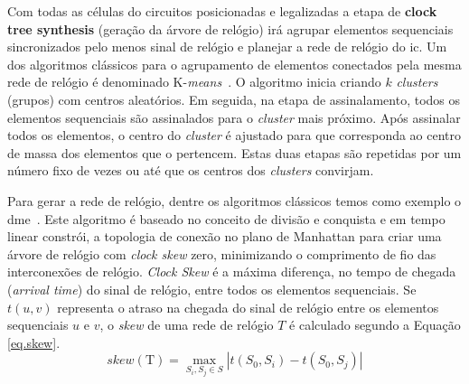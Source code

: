 Com todas as células do circuitos posicionadas e legalizadas a etapa de \textbf{clock tree synthesis} (geração da árvore de relógio) irá agrupar elementos  sequenciais sincronizados pelo menos sinal de relógio e planejar a rede de relógio do \ac{ic}.
Um dos algoritmos clássicos para o agrupamento de elementos conectados pela mesma rede de relógio é denominado K-\textit{means}~\cite{selim1984k}.
O algoritmo inicia criando $k$ \textit{clusters} (grupos) com centros aleatórios. Em seguida, na etapa de assinalamento, todos os elementos sequenciais são assinalados para o \textit{cluster} mais próximo.
Após assinalar todos os elementos, o centro do \textit{cluster} é ajustado para que corresponda ao centro de massa dos elementos que o pertencem. Estas duas etapas são repetidas por um número fixo de vezes ou até que os centros dos \textit{clusters} convirjam.

Para gerar a rede de relógio, dentre os algoritmos clássicos temos como exemplo o \ac{dme}~\cite{boese1992zero}.
Este algoritmo é baseado no conceito de divisão e conquista e em tempo linear constrói, a topologia de conexão no plano de Manhattan para criar uma árvore de relógio com \textit{clock skew} zero, minimizando o comprimento de fio das interconexões de relógio.
\textit{Clock Skew} é a máxima diferença, no tempo de chegada (\textit{arrival time}) do sinal de relógio, entre todos os elementos sequenciais. Se $t(u,v)$ representa o atraso na chegada do sinal de relógio entre os elementos sequenciais $u$ e $v$, o \textit{skew} de uma rede de relógio $T$ é calculado segundo a Equação \ref{eq.skew}.
\begin{equation} \label{eq.skew}
	 \displaystyle \operatorname{\textit{skew}(T)} = \max_{S_{i}, S_{j} \in S} | t(S_{0},S_{i})-t(S_{0},S_{j})|
\end{equation} 

